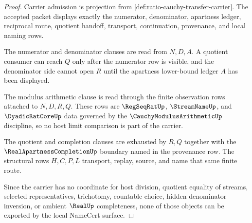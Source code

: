 \begin{proof}
Carrier admission is projection from \autoref{def:ratio-cauchy-transfer-carrier}. The accepted packet displays exactly the numerator, denominator, apartness ledger, reciprocal route, quotient handoff, transport, continuation, provenance, and local naming rows.

The numerator and denominator clauses are read from $N,D,A$. A quotient consumer can reach $Q$ only after the numerator row is visible, and the denominator side cannot open $R$ until the apartness lower-bound ledger $A$ has been displayed.

The modulus arithmetic clause is read through the finite observation rows attached to $N,D,R,Q$. These rows are $\RegSeqRatUp$, $\StreamNameUp$, and $\DyadicRatCoreUp$ data governed by the $\CauchyModulusArithmeticUp$ discipline, so no host limit comparison is part of the carrier.

The quotient and completion clauses are exhausted by $R,Q$ together with the $\RealApartnessCompletionUp$ boundary named in the provenance row. The structural rows $H,C,P,L$ transport, replay, source, and name that same finite route.

Since the carrier has no coordinate for host division, quotient equality of streams, selected representatives, trichotomy, countable choice, hidden denominator inversion, or ambient $\RealUp$ completeness, none of those objects can be exported by the local NameCert surface.
\end{proof}

